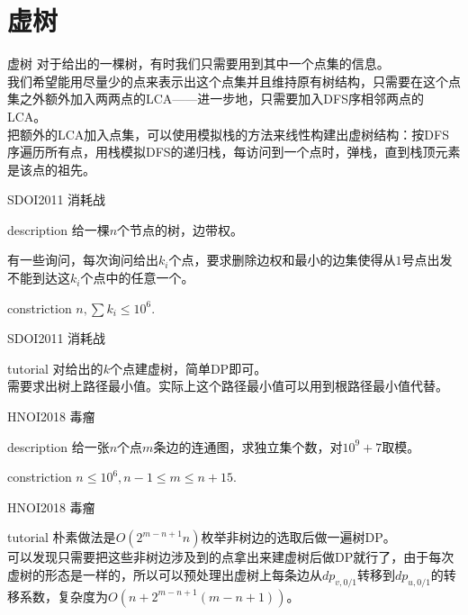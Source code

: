 \documentclass{beamer}
\begin{document}
\section{虚树}
\begin{frame}{虚树}
	对于给出的一棵树，有时我们只需要用到其中一个点集的信息。\\
	
	我们希望能用尽量少的点来表示出这个点集并且维持原有树结构，只需要在这个点集之外额外加入两两点的LCA——进一步地，只需要加入DFS序相邻两点的LCA。\\
	
	把额外的LCA加入点集，可以使用模拟栈的方法来线性构建出虚树结构：按DFS序遍历所有点，用栈模拟DFS的递归栈，每访问到一个点时，弹栈，直到栈顶元素是该点的祖先。
	
\end{frame}
\begin{frame}{SDOI2011 消耗战}
	\begin{block}{description}
		给一棵$n$个节点的树，边带权。
		
		有一些询问，每次询问给出$k_i$个点，要求删除边权和最小的边集使得从$1$号点出发不能到达这$k_i$个点中的任意一个。
	\end{block}
	\begin{block}{constriction}
		$n, \sum k_i \le 10^6.$
	\end{block}
\end{frame}
\begin{frame}{SDOI2011 消耗战}
	\begin{block}{tutorial}
		对给出的$k$个点建虚树，简单DP即可。\\
		
		需要求出树上路径最小值。实际上这个路径最小值可以用到根路径最小值代替。
	\end{block}
\end{frame}
\begin{frame}{HNOI2018 毒瘤}
	\begin{block}{description}
		给一张$n$个点$m$条边的连通图，求独立集个数，对$10^9+7$取模。
	\end{block}
	\begin{block}{constriction}
		$n \le 10^6, n-1 \le m \le n+15.$
	\end{block}
\end{frame}
\begin{frame}{HNOI2018 毒瘤}
	\begin{block}{tutorial}
		朴素做法是$O(2^{m-n+1}n)$枚举非树边的选取后做一遍树DP。\\
		
		可以发现只需要把这些非树边涉及到的点拿出来建虚树后做DP就行了，由于每次虚树的形态是一样的，所以可以预处理出虚树上每条边从$dp_{v,0/1}$转移到$dp_{u,0/1}$的转移系数，复杂度为$O(n+2^{m-n+1}(m-n+1))$。
	\end{block}
\end{frame}
\end{document}

